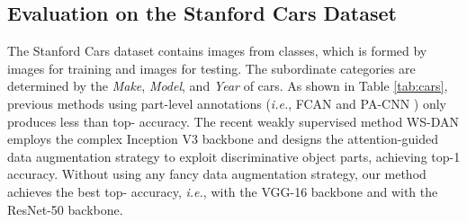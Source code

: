 \documentclass[10pt,twocolumn,letterpaper]{article}
\def\ie{{\em i.e.}}
\begin{document}
\subsection{Evaluation on the Stanford Cars Dataset}
The Stanford Cars dataset \cite{DBLP:conf/iccvw/Krause0DF13} contains  images from  classes, which is formed by  images for training and  images for testing. The subordinate categories are determined by the \textit{Make}, \textit{Model}, and \textit{Year} of cars. As shown in Table \ref{tab:cars}, previous methods using part-level annotations (\ie, FCAN \cite{DBLP:journals/corr/LiuXWL16} and PA-CNN \cite{DBLP:conf/cvpr/KrauseJYL15}) only produces less than  top- accuracy. The recent weakly supervised method WS-DAN \cite{DBLP:journals/corr/abs-1901-09891} employs the complex Inception V3 backbone \cite{DBLP:conf/cvpr/SzegedyVISW16} and designs the attention-guided data augmentation strategy to exploit discriminative object parts, achieving  top-1 accuracy. Without using any fancy data augmentation strategy, our method achieves the best top- accuracy, \ie,  with the VGG-16 backbone and  with the ResNet-50 backbone. 
\end{document}
